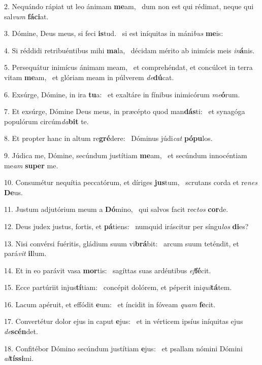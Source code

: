 2. Nequándo rápiat ut leo ánimam \textbf{me}am, \ast\  dum non est qui rédimat, neque qui sal\textit{vum} \textbf{fá}\textbf{ci}at.\

3. Dómine, Deus meus, si feci \textbf{is}tud. \ast\  si est iníquitas in máni\textit{bus} \textbf{me}is:\

4. Si réddidi retribuéntibus mihi \textbf{ma}la, \ast\  décidam mérito ab inimícis meis \textit{in}\textbf{á}nis.\

5. Persequátur inimícus ánimam meam, \dag\  et comprehéndat, et concúlcet in terra vitam \textbf{me}am, \ast\  et glóriam meam in púlverem \textit{de}\textbf{dú}cat.\

6. Exsúrge, Dómine, in ira \textbf{tu}a: \ast\  et exaltáre in fínibus inimicórum \textit{me}\textbf{ó}rum.\

7. Et exsúrge, Dómine Deus meus, in præcépto quod man\textbf{dás}ti: \ast\  et synagóga populórum circúm\textit{da}\textbf{bit} te.\

8. Et propter hanc in altum re\textbf{gré}dere: \ast\  Dóminus júdi\textit{cat} \textbf{pó}\textbf{pu}los.\

9. Júdica me, Dómine, secúndum justítiam \textbf{me}am, \ast\  et secúndum innocéntiam me\textit{am} \textbf{su}\textbf{per} me.\

10. Consumétur nequítia peccatórum, et díriges \textbf{jus}tum, \ast\  scrutans corda et re\textit{nes} \textbf{De}us.\

11. Justum adjutórium meum a \textbf{Dó}mino, \ast\  qui salvos facit rec\textit{tos} \textbf{cor}de.\

12. Deus judex justus, fortis, et \textbf{pá}tiens: \ast\  numquid iráscitur per síngu\textit{los} \textbf{di}es?\

13. Nisi convérsi fuéritis, gládium suum vi\textbf{brá}bit: \ast\  arcum suum teténdit, et pará\textit{vit} \textbf{il}lum.\

14. Et in eo parávit vasa \textbf{mor}tis: \ast\  sagíttas suas ardéntibus \textit{ef}\textbf{fé}cit.\

15. Ecce partúriit injus\textbf{tí}tiam: \ast\  concépit dolórem, et péperit ini\textit{qui}\textbf{tá}tem.\

16. Lacum apéruit, et effódit \textbf{e}um: \ast\  et íncidit in fóveam \textit{quam} \textbf{fe}cit.\

17. Convertétur dolor ejus in caput \textbf{e}jus: \ast\  et in vérticem ipsíus iníquitas ejus \textit{de}\textbf{scén}det.\

18. Confitébor Dómino secúndum justítiam \textbf{e}jus: \ast\  et psallam nómini Dómini \textit{al}\textbf{tís}\textbf{si}mi.\

